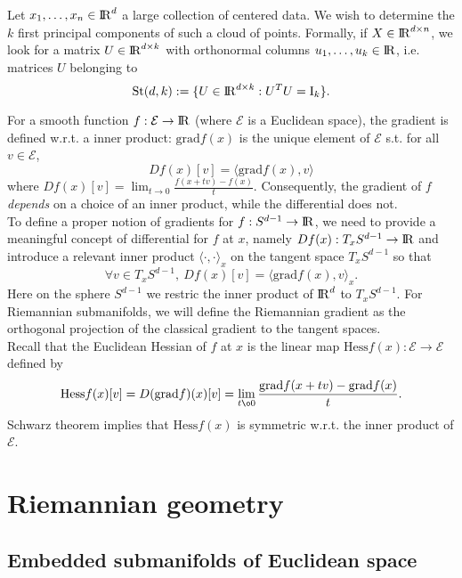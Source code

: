 \documentclass[10pt,a4paper]{book}
\theoremstyle{definition}
\theoremstyle{plain}
\theoremstyle{remark}
\newcommand{\grad}{\textrm{grad}}
\newcommand \Hess {\text{Hess}}
\def\R{{\rm I\kern-0.16em R}}
\begin{document}
\par \medskip
Let $x_1,\dots, x_n\in \R^d$ a large collection of centered data. We wish to determine the $k$ first principal components of such a cloud of points. Formally, if $X\in \R^{d\times n}$, we look for a matrix $U\in \R^{d\times k}$ with orthonormal columns $u_1,\dots, u_k \in \R$, i.e. matrices $U$ belonging to
$$\text{St}(d,k):=\{U\in \R^{d\times k}: U^{T}U=\text{I}_k\}.$$
\par\medskip
For a smooth function $f:\mathcal{E} \to \R$ (where $\mathcal{E}$ is a Euclidean space), the gradient is defined w.r.t. a inner product: $\grad f(x)$ is the unique element of $\mathcal{E}$ s.t. for all $v\in \mathcal{E}$,
$$Df(x)[v]=\langle \grad f(x),v\rangle$$
where $Df(x)[v]=\lim_{t\to 0}\frac{f(x+tv)-f(x)}{t}$. Consequently, the gradient of $f$ \emph{depends} on a choice of an inner product, while the differential does not. \\ To define a proper notion of gradients for $f:S^{d-1}\to \R$, we need to provide a meaningful concept of differential for $f$ at $x$, namely $Df(x):T_xS^{d-1}\to \R$ and introduce a relevant inner product $\langle \cdot,\cdot \rangle_x$ on the tangent space $T_xS^{d-1}$ so that
$$\forall v\in T_xS^{d-1},~Df(x)[v]=\langle \grad f(x),v\rangle_x.$$
Here on the sphere $S^{d-1}$ we restric the inner product of $\R^d$ to $T_xS^{d-1}$. For Riemannian submanifolds, we will define the Riemannian gradient as the orthogonal projection of the classical gradient to the tangent spaces.
\\ Recall that the Euclidean Hessian of $f$ at $x$ is the linear map $\Hess f(x):\mathcal{E}\to \mathcal{E}$ defined by
$$\Hess f(x)[v]=D(\grad f)(x)[v]=\lim_{t\o 0}\frac{\grad f(x+tv)-\grad f(x)}{t}.$$
Schwarz theorem implies that $\Hess f(x)$ is symmetric w.r.t. the inner product of $\mathcal{E}$.

\chapter{Riemannian geometry}
\section{Embedded submanifolds of Euclidean space}
\end{document}
